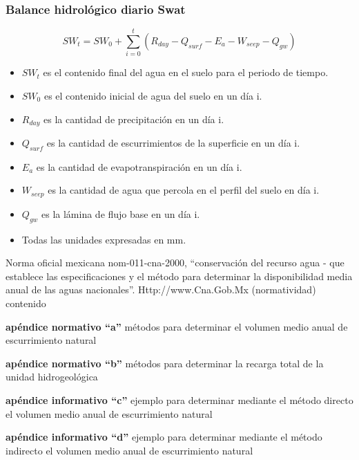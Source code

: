 \subsubsection{Balance hidrológico diario Swat}
\begin{equation}
    SW_t = SW_0 +\sum_{i = 0}^t\left(R_{day} - Q_{surf} - E_a - W_{seep} - Q_{gw}\right)
\end{equation}
\begin{itemize}
    \item $SW_t$ es el contenido final del agua en el suelo para el periodo de tiempo.
    \item $SW_0$ es el contenido inicial de agua del suelo en un día i.
    \item $R_{day}$ es la cantidad de precipitación en un día i.
    \item $Q_{surf}$ es la cantidad de escurrimientos de la superficie en un día i.
    \item $E_a$ es la cantidad de evapotranspiración en un día i.
    \item $W_{seep}$ es la cantidad de agua que percola en el perfil del suelo en día i.
    \item $Q_{gw}$ es la lámina de flujo base en un día i.
    \item Todas las unidades expresadas en mm.
\end{itemize}
Norma oficial mexicana nom-011-cna-2000, ``conservación del recurso agua - que establece las especificaciones y el método para determinar la disponibilidad media anual de las aguas nacionales''. Http://www.Cna.Gob.Mx (normatividad) contenido

\textbf{apéndice normativo ``a''}
métodos para determinar el volumen medio anual de escurrimiento natural

\textbf{apéndice normativo ``b''}
métodos para determinar la recarga total de la unidad
hidrogeológica

\textbf{apéndice informativo ``c''}
ejemplo para determinar mediante el método directo el volumen medio anual de escurrimiento natural

\textbf{apéndice informativo ``d''}
ejemplo para determinar mediante el método indirecto el volumen medio anual de escurrimiento natural

